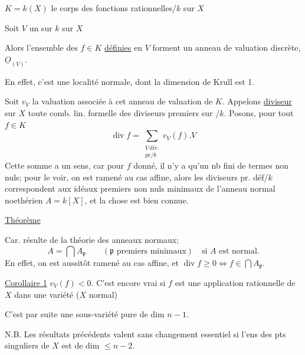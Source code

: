 $K=k(X)$ le corps des fonctions rationnelles/$k$ sur $X$

Soit $V$ un   sur $k$ sur $X$

Alors l'ensemble des $f\in K$ \uline{définies} en $V$ forment un anneau de valuation discrète,  $\underline O_{(V)}$.

En effet, c'est une  localité normale, dont la dimension de Krull est 1.

Soit $v_V$ la valuation  associée à cet anneau de valuation de $K$. Appelons \uline{diviseur}  sur $X$ toute comb. lin. formelle des diviseurs premiers sur /$k$. Posons, pour tout $f\in K$
\[
\operatorname{div}f=\sum_{\substack{V\,\mathrm{div.}\\\mathrm{pr}/k}}v_V(f).V
\]
Cette somme a un sens, car pour $f$ donné, il n'y a qu'un nb fini de termes non nuls;  pour le voir, on est ramené au cas  affine, alors les diviseurs pr. déf/$k$ correspondent aux idéaux premiers non nuls minimaux de l'anneau normal noethérien $A=k[X]$, et la chose est bien connue.

\uline{Théorème}  

Car. résulte de la théorie des anneaux normaux;
\[
A=\bigcap A_{\mathfrak p}\qquad(\mathfrak p\text{ premiers minimaux})\quad\text{si }A\text{ est normal.}
\]
En effet, on est aussitôt ramené au cas affine, et $\operatorname{div}f\geq0\Longleftrightarrow f\in\bigcap A_{\mathfrak p}$.

\uline{Corollaire 1}   $v_V(f)<0$. C'est encore vrai si $f$ est une application rationnelle de $X$ dans une variété \uline{} ($X$ normal)

C'est par suite une sous-variété pure de dim $n-1$.

 N.B. Les résultats précédents valent sans changement essentiel si  l'ens des pts singuliers de $X$ est de dim $\leq n-2$.

